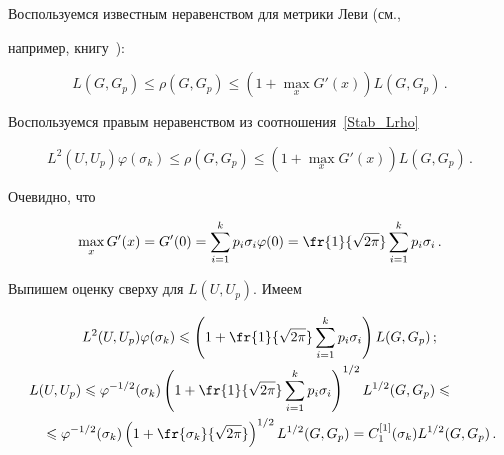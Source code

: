 Воспользуемся известным неравенством для метрики Леви (см.,

например, книгу~\cite{Zolotarev1986}):

\begin{equation}

\label{Stab_Lrho} 

L(G,G_p)\leqslant\rho(G,G_p)\leqslant(1+\max\limits_x

G'(x))L(G,G_p)\,.

\end{equation}



Воспользуемся правым неравенством из соотношения~\eqref{Stab_Lrho}

$$

L^2(U,U_p)\varphi(\sigma_k)\leqslant\rho(G,G_p)\leqslant(1+\max\limits_x

G'(x))L(G,G_p)\,.

$$



\noindent

Очевидно, что

$$

\max\limits_x G'(x)=G'(0)=\sum\limits_{i=1}^k p_i\sigma_i\varphi(0)=

\fr{1}{\sqrt{2\pi}}\sum\limits_{i=1}^k p_i\sigma_i\,.

$$



Выпишем оценку сверху для $L(U,U_p)$. Имеем

\begin{gather*}

L^2(U,U_p)\varphi(\sigma_k)\leqslant\left(1+\fr{1}{\sqrt{2\pi}}\sum\limits_{i=1}^k

p_i\sigma_i\right)L(G,G_p)\,;\\

\hspace*{-9mm}L(U,U_p)\leqslant\varphi^{-1/2}

(\sigma_k)\left(1+\fr{1}{\sqrt{2\pi}}\sum\limits_{i=1}^k

p_i\sigma_i\right)^{1/2}L^{1/2}(G,G_p)\leqslant{}\\

\hspace*{5mm}{}\leqslant\varphi^{-1/2}(\sigma_k)\left(1+\fr{\sigma_k}{\sqrt{2\pi}}

\right)^{1/2}L^{1/2}(G,G_p)=

C_1^{[1]}(\sigma_k)L^{1/2}(G,G_p)\,.

\end{gather*}

